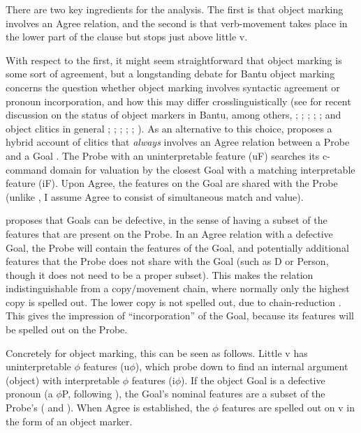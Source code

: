 \documentclass[output=paper
,modfonts
,nonflat]{langsci/langscibook}
\begin{document}
There are two key ingredients for the analysis. The first is that object marking involves an Agree relation, and the second is that verb-movement takes place in the lower part of the clause but stops just above little v.

With respect to the first, it might seem straightforward that object marking is some sort of agreement, but a longstanding debate for Bantu object marking concerns the question whether object marking involves syntactic agreement or pronoun incorporation, and how this may differ crosslinguistically (see for recent discussion on the status of object markers in Bantu, among others, \citealt{Henderson2006}; \citealt{Riedel2009}; \citealt{Zeller2012}; \citealt{Iorio2014}; \citealt{Baker2016}; and object clitics in general \citealt{Preminger2009}; \citealt{Nevins2011}; \citealt{Anagnostopoulou2014, Anagnostopoulou2016}; \citealt{Kramer2014}; \citealt{Harizanov2014}; \citealt{Baker_Kramer2016}). As an alternative to this choice, \citet{Roberts2010} proposes a hybrid account of clitics that \textit{always} involves an Agree relation between a Probe and a Goal \citep{Chomsky2000, Chomsky2001}. The Probe with an uninterpretable feature (uF) searches its c-command domain for valuation by the closest Goal with a matching interpretable feature (iF). Upon Agree, the features on the Goal are shared with the Probe (unlike , I assume Agree to consist of simultaneous match and value).

\citet{Roberts2010} proposes that Goals can be defective, in the sense of having a subset of the features that are present on the Probe. In an Agree relation with a defective Goal, the Probe will contain the features of the Goal, and potentially additional features that the Probe does not share with the Goal (such as D or Person, though it does not need to be a proper subset). This makes the relation indistinguishable from a copy/movement chain, where normally only the highest copy is spelled out. The lower copy is not spelled out, due to chain-reduction \citep{Nunes2004}. This gives the impression of “incorporation” of the Goal, because its features will be spelled out on the Probe.

Concretely for object marking, this can be seen as follows. Little v has uninterpretable $\phi $ features (u$\phi$), which probe down to find an internal argument (object) with interpretable $\phi$ features (i$\phi$). If the object Goal is a defective pronoun (a $\phi$P, following \citealt{Dechaine_Wiltschko2002}), the Goal’s nominal features are a subset of the Probe’s ( and ). When Agree is established, the $\phi$ features are spelled out on v in the form of an object marker.
\end{document}
